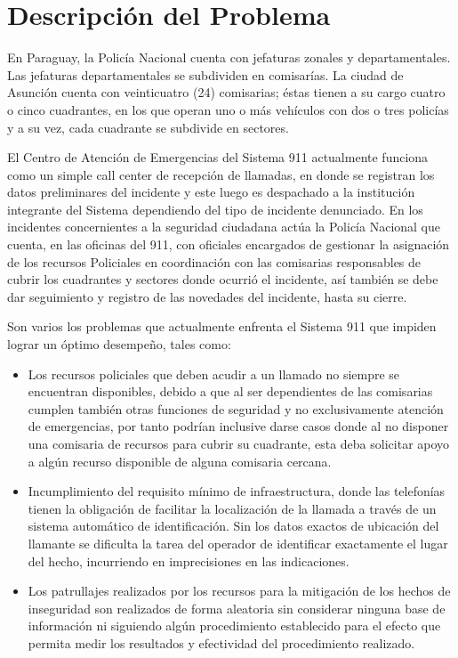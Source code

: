 \section{Descripción del Problema}
En Paraguay, la Policía Nacional cuenta con jefaturas zonales y departamentales. Las jefaturas departamentales se subdividen en comisarías. La ciudad de Asunción cuenta con veinticuatro (24) comisarias; éstas tienen a su cargo cuatro o cinco cuadrantes, en los que operan uno o más vehículos con dos o tres policías y a su vez, cada cuadrante se subdivide en sectores. 

El Centro de Atención de Emergencias del Sistema 911 actualmente funciona como un simple call center de recepción de llamadas, en donde se registran los datos preliminares del incidente y este luego es despachado a la  institución integrante del Sistema \cite{ley4739} dependiendo del tipo de incidente denunciado. En los incidentes concernientes a la seguridad ciudadana actúa la Policía Nacional que cuenta, en las oficinas del 911, con oficiales encargados de gestionar la asignación de los recursos Policiales en coordinación con las comisarias responsables de cubrir los cuadrantes y sectores donde ocurrió el incidente, así también se debe dar seguimiento y registro de las novedades del incidente, hasta su cierre.

Son varios los problemas que actualmente enfrenta el Sistema 911 que impiden lograr un óptimo desempeño, tales como:
\begin{itemize}
\item Los recursos policiales que deben acudir a un llamado no siempre se encuentran disponibles, debido a que al ser dependientes de las comisarias cumplen también otras funciones de seguridad y no exclusivamente atención de emergencias, por tanto podrían inclusive darse casos donde al no disponer una comisaria de recursos para cubrir su cuadrante, esta deba solicitar apoyo a algún recurso disponible de alguna comisaria cercana.
\item Incumplimiento del requisito mínimo de infraestructura, donde las telefonías tienen la obligación de facilitar la localización de la llamada a través de un sistema automático de identificación. Sin los datos exactos de ubicación del llamante se dificulta la tarea del operador de identificar exactamente el lugar del hecho, incurriendo en imprecisiones en las indicaciones.
\item Los patrullajes realizados por los recursos para la mitigación de los hechos de inseguridad son realizados de forma aleatoria sin considerar ninguna base de información ni siguiendo algún procedimiento establecido para el efecto que permita medir los resultados y efectividad del procedimiento realizado. 
\end{itemize}

